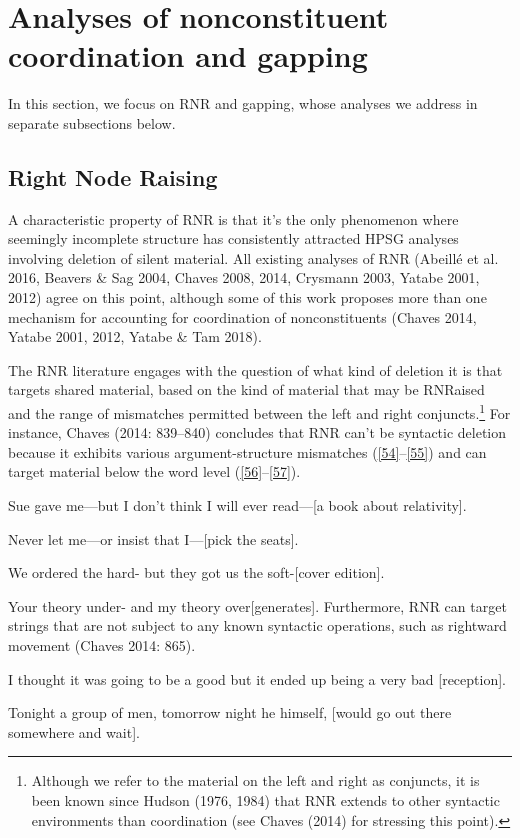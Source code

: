 \documentclass[output=paper
                ,modfonts
                ,nonflat
	        ,collection
	        ,collectionchapter
	        ,collectiontoclongg
 	        ,biblatex
                ,babelshorthands
                ,newtxmath
                ,draftmode
                ,colorlinks, citecolor=brown
]{./langsci/langscibook}
\begin{document}
{\section{Analyses of nonconstituent coordination and gapping}
In this section, we focus on RNR and gapping, whose analyses we address in separate subsections below.

\subsection{Right Node Raising}
A characteristic property of RNR is that it's the only phenomenon where seemingly incomplete structure has consistently attracted HPSG analyses involving deletion of silent material. All existing analyses of RNR (Abeill\'{e} et al. 2016, Beavers \& Sag 2004, Chaves 2008, 2014, Crysmann 2003, Yatabe 2001, 2012) agree on this point, although some of this work proposes more than one mechanism for accounting for coordination of nonconstituents (Chaves 2014, Yatabe 2001, 2012, Yatabe \& Tam 2018).

The RNR literature engages with the question of what kind of deletion it is that targets shared material, based on the kind of material that may be RNRaised and the range of mismatches permitted between the left and right conjuncts.\footnote{Although we refer to the material on the left and right as conjuncts, it is been known since Hudson (1976, 1984) that RNR extends to other syntactic environments than coordination (see Chaves (2014) for stressing this point).} For instance, Chaves (2014: 839--840) concludes that RNR can't be syntactic deletion because it exhibits various argument-structure mismatches (\ref{54}--\ref{55}) and can target material below the word level (\ref{56}--\ref{57}).


\ea Sue gave me---but I don't think I will ever read---[a book about relativity]. \label{54}\z

\ea Never let me---or insist that I---[pick the seats].\label{55}\z

\ea We ordered the hard- but they got us the soft-[cover edition].\label{56}\z

\ea Your theory under- and my theory over[generates].\label{57}\z
Furthermore, RNR can target strings that are not subject to any known syntactic operations, such as rightward movement (Chaves 2014: 865).

\ea I thought it was going to be a good but it ended up being a very bad [reception].\label{58}\z

\ea Tonight a group of men, tomorrow night he himself, [would go out there somewhere and wait].\label{59}\z

}
\end{document}
